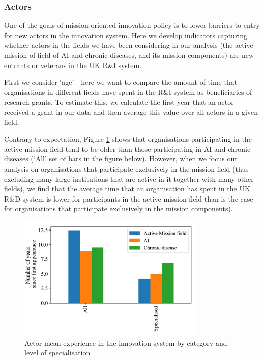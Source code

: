 \documentclass[11pt]{article}
\begin{document}
\subsubsection{Actors}

One of the goals of mission-oriented innovation policy is to lower barriers to entry for new actors in the innovation system. Here we develop indicators capturing whether actors in the fields we have been considering in our analysis (the active mission of field of AI and chronic diseases, and its mission components) are new entrants or veterans in the UK R\&I system.

First we consider `age’ - here we want to compare the amount of time that organisations in different fields have spent in the R&I system as beneficiaries of research grants. To estimate this, we calculate the first year that an actor received a grant in our data and then average this value over all actors in a given field. 

Contrary to expectation, Figure \ref{fig:actor_exp} shows that organisations participating in the active mission field tend to be older than those participating in AI and chronic diseases (‘All’ set of bars in the
figure below). However, when we focus our analysis on organisations that participate exclusively in the mission field (thus excluding many large institutions that are active in it together with many other fields), we find that the average time that an organisation has spent in the UK R\&D system is lower for participants in the active mission field than is the case for organisations that participate exclusively in the mission components).

\begin{figure}[!ht]
    \centering
    \includegraphics[width=0.8\textwidth]{figures/fig_13_actor_experience.pdf}
    \caption{Actor mean experience in the innovation system by category and level of specialisation}
    \label{fig:actor_exp}
\end{figure}
\end{document}
